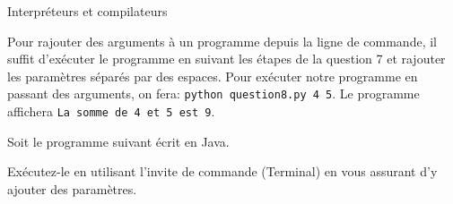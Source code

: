 \begin{section}{Interpréteurs et compilateurs}
\begin{Exercice}[10 minutes]
        \begin{solution}
            Pour rajouter des arguments à un programme depuis la ligne de commande, il suffit d'exécuter le programme en suivant les étapes de la question 7 et rajouter les paramètres séparés par des espaces. Pour exécuter notre programme en passant des arguments, on fera: \lstinline{python question8.py 4 5}. Le programme affichera \lstinline{La somme de 4 et 5 est 9}.
        \end{solution}

    \end{Exercice}

    \begin{Exercice}[10 minutes]
        Soit le programme suivant écrit en Java. 

        
        
        Exécutez-le en utilisant l'invite de commande (Terminal) en vous assurant d'y ajouter des paramètres.
    


\end{Exercice}
\end{section}
